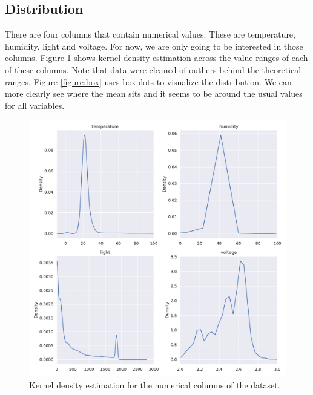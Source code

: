 \documentclass[a4paper,11pt]{article}
\begin{document}
	\subsection{Distribution}
	\label{subsection:distribution}
		There are four columns that contain numerical values. These are temperature, humidity, light and voltage. For now, we are only going to be interested in those columns. Figure \ref{figure:kde} shows kernel density estimation across the value ranges of each of these columns. Note that data were cleaned of outliers behind the theoretical ranges. Figure \ref{figure:box} uses boxplots to visualize the distribution. We can more clearly see where the mean sits and it seems to be around the usual values for all variables.
		\begin{figure}[H]
			\centering
			\includegraphics[scale=0.5]{density.pdf}
			\caption{Kernel density estimation for the numerical columns of the dataset.}
			\label{figure:kde}
		\end{figure}
\end{document}
